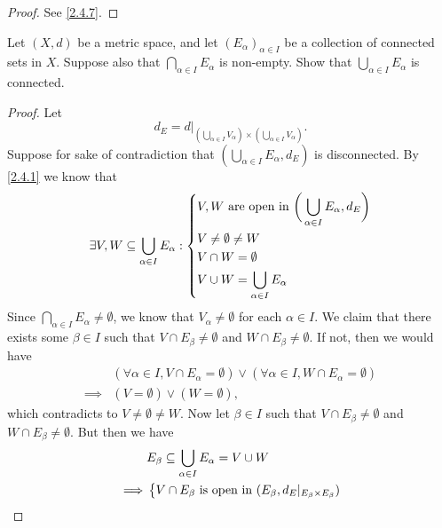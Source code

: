 \begin{proof}
  See \cref{2.4.7}.
\end{proof}

\begin{ex}\label{ex:2.4.6}
  Let \((X, d)\) be a metric space, and let \((E_\alpha)_{\alpha \in I}\) be a collection of connected sets in \(X\).
  Suppose also that \(\bigcap_{\alpha \in I} E_\alpha\) is non-empty.
  Show that \(\bigcup_{\alpha \in I} E_\alpha\) is connected.
\end{ex}

\begin{proof}
  Let
  \[
    d_E = d|_{(\bigcup_{\alpha \in I} V_\alpha) \times (\bigcup_{\alpha \in I} V_\alpha)}.
  \]
  Suppose for sake of contradiction that \((\bigcup_{\alpha \in I} E_\alpha, d_E)\) is disconnected.
  By \cref{2.4.1} we know that
  \[
    \exists V, W \subseteq \bigcup_{\alpha \in I} E_\alpha : \begin{dcases}
      V, W \text{ are open in } \bigg(\bigcup_{\alpha \in I} E_\alpha, d_E\bigg) \\
      V \neq \emptyset \neq W                                                    \\
      V \cap W = \emptyset                                                       \\
      V \cup W = \bigcup_{\alpha \in I} E_\alpha
    \end{dcases}
  \]
  Since \(\bigcap_{\alpha \in I} E_\alpha \neq \emptyset\), we know that \(V_\alpha \neq \emptyset\) for each \(\alpha \in I\).
  We claim that there exists some \(\beta \in I\) such that \(V \cap E_\beta \neq \emptyset\) and \(W \cap E_\beta \neq \emptyset\).
  If not, then we would have
  \begin{align*}
             & (\forall \alpha \in I, V \cap E_\alpha = \emptyset) \lor (\forall \alpha \in I, W \cap E_\alpha = \emptyset) \\
    \implies & (V = \emptyset) \lor (W = \emptyset),
  \end{align*}
  which contradicts to \(V \neq \emptyset \neq W\).
  Now let \(\beta \in I\) such that \(V \cap E_\beta \neq \emptyset\) and \(W \cap E_\beta \neq \emptyset\).
  But then we have
  \begin{align*}
             & E_\beta \subseteq \bigcup_{\alpha \in I} E_\alpha = V \cup W                                   \\
    \implies & \begin{dcases}
                 V \cap E_\beta \text{ is open in } (E_\beta, d_E|_{E_\beta \times E_\beta}) \\

\end{dcases}
\end{align*}
\end{proof}
